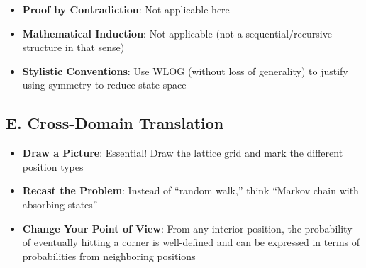 \documentclass[12pt]{article}
\begin{document}
\begin{strategicbox}
\begin{itemize}[leftmargin=*]
    \item \textbf{Proof by Contradiction}: Not applicable here
    
    \item \textbf{Mathematical Induction}: Not applicable (not a sequential/recursive structure in that sense)
    
    \item \textbf{Stylistic Conventions}: Use WLOG (without loss of generality) to justify using symmetry to reduce state space
\end{itemize}

\subsection*{E. Cross-Domain Translation}
\begin{itemize}[leftmargin=*]
    \item \textbf{Draw a Picture}: Essential! Draw the lattice grid and mark the different position types
    
    \item \textbf{Recast the Problem}: Instead of ``random walk,'' think ``Markov chain with absorbing states''
    
    \item \textbf{Change Your Point of View}: From any interior position, the probability of eventually hitting a corner is well-defined and can be expressed in terms of probabilities from neighboring positions
\end{itemize}
\end{strategicbox}
\end{document}
